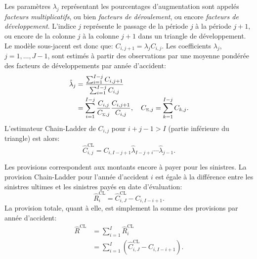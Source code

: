 Les paramètres $\lambda_j$ représentant les pourcentages
d'augmentation sont appelés \emph{facteurs multiplicatifs}, ou bien
\emph{facteurs de déroulement}, ou encore \emph{facteurs de
  développement}. L'indice $j$ représente le passage de la période $j$
à la période $j + 1$, ou encore de la colonne $j$ à la colonne $j+1$
dans un triangle de développement. Le modèle sous-jacent est donc que:
$C_{i, j+1} = \lambda_j C_{i, j}$. Les coefficients $\lambda_j$,
$j = 1, \dots, J - 1$, sont estimés à partir des observations par une
moyenne pondérée des facteurs de développements par année d'accident:
\begin{align*}
  \hat{\lambda}_j
  &= \frac{\sum_{i = 1}^{I - j} C_{i, j + 1}}{%
    \sum_{i = 1}^{I - j} C_{i, j}} \\
  &= \sum_{i = 1}^{I - j} \frac{C_{i, j}}{C_{\pt, j}}
    \frac{C_{i, j + 1}}{C_{i, j}}, \quad
    C_{\pt, j} = \sum_{k = 1}^{I - j} C_{k, j}.
\end{align*}
L'estimateur Chain-Ladder de $C_{i, j}$ pour $i + j - 1 > I$ (partie
inférieure du triangle) est alors:
\begin{equation*}
  \hat{C}_{i, j}^{\text{CL}}
  = C_{i, I - j + 1} \hat{\lambda}_{I - j + i} \cdots \hat{\lambda}_{j - 1}.
\end{equation*}

Les provisions correspondent aux montants encore à payer pour les
sinistres. La provision Chain-Ladder pour l'année d'accident $i$ est
égale à la différence entre les sinistres ultimes et les sinistres
payés en date d'évaluation:
\begin{equation*}
  \hat{R}_i^{\text{CL}} = \hat{C}_{i, J}^{\text{CL}} - C_{i, I - i + 1}.
\end{equation*}
La provision totale, quant à elle, est simplement la somme des
provisions par année d'accident:
\begin{align*}
  \hat{R}^{\text{CL}}
  &= \sum_{i = 1}^I \hat{R}_i^{\text{CL}} \\
  &= \sum_{i = 1}^I (\hat{C}_{i, J}^{\text{CL}} - C_{i, I - i + 1}).
\end{align*}

